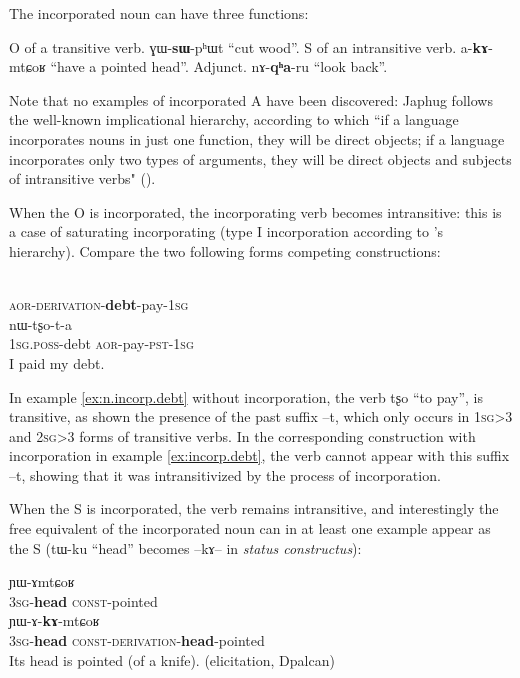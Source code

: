 \documentclass[oldfontcommands,oneside,a4paper,11pt]{article}
\newcommand{\ipa}[1]{{\phon #1}} %
\newcommand{\aor}{\textsc{aor}}
\newcommand{\const}{\textsc{const}}
\newcommand{\poss}{\textsc{poss}}
\newcommand{\pst}{\textsc{pst}}
\newcommand{\sg}{\textsc{sg}}
\begin{document}
The incorporated noun can have three functions:

 \begin{exe}
\ex
 \glt  O of a transitive verb. \ipa{ɣɯ-\textbf{sɯ}-pʰɯt} ``cut wood''.
  \glt  S of an  intransitive  verb. \ipa{a-\textbf{kɤ}-mtɕoʁ} ``have a pointed head''.
 \glt Adjunct. \ipa{nɤ-\textbf{qʰa}-ru} ``look back''.
\end{exe}   
Note that no examples of incorporated A have been discovered: Japhug follows the well-known implicational hierarchy, according to which ``if a language incorporates nouns in just one function, they will be direct objects;
if a language incorporates only two types of arguments, they will be direct
objects and subjects of intransitive verbs" (\citealt[19]{aikhenvald07wordformation}).


When the O is incorporated, the  incorporating verb becomes intransitive: this is a case of saturating incorporating (type I incorporation according to  \citet{mithun84incorp}'s hierarchy). Compare the two following forms competing constructions:


 \begin{exe}
\ex \label{ex:incorp.debt}
\gll  \ipa{nɯ-nɯ-\textbf{nŋɤ}-tʂo-a} \\
\aor{}-\textsc{derivation}-\textbf{debt}-pay-1\sg{} \\
\ex \label{ex:n.incorp.debt}
\gll \ipa{a-nŋa}  \ipa{nɯ-tʂo-t-a} \\
1\sg{}.\poss{}-debt \aor{}-pay-\pst{}-1\sg{} \\
 \glt I paid my debt.
\end{exe}   

In example \ref{ex:n.incorp.debt} without incorporation, the verb \ipa{tʂo} ``to pay'', is transitive, as shown the presence of the past suffix --\ipa{t}, which only occurs in 1\sg{}>3 and 2\sg{}>3 forms of transitive verbs. In the corresponding construction with incorporation in example \ref{ex:incorp.debt}, the verb cannot appear with this suffix --\ipa{t}, showing that it was intransitivized by the process of incorporation.

When the S is incorporated, the verb remains intransitive, and interestingly the free equivalent of the incorporated noun can in at least one example appear as the S (\ipa{tɯ-ku} ``head'' becomes --\ipa{kɤ}-- in \textit{status constructus}):
 \begin{exe}
\ex
\begin{xlist}[(ii)]
\gll  \ipa{ɯ-\textbf{ku}} \ipa{ɲɯ-ɤmtɕoʁ}  	  \\
 3\sg{}-\textbf{head} \const{}-pointed\\
\gll  \ipa{ɯ-\textbf{ku}} \ipa{ɲɯ-ɤ-\textbf{kɤ}-mtɕoʁ}  	  \\
 3\sg{}-\textbf{head} \const{}-\textsc{derivation}-\textbf{head}-pointed\\
 \glt Its head is pointed (of a knife). (elicitation, Dpalcan)
 \end{xlist}
\end{exe}   
\end{document}

